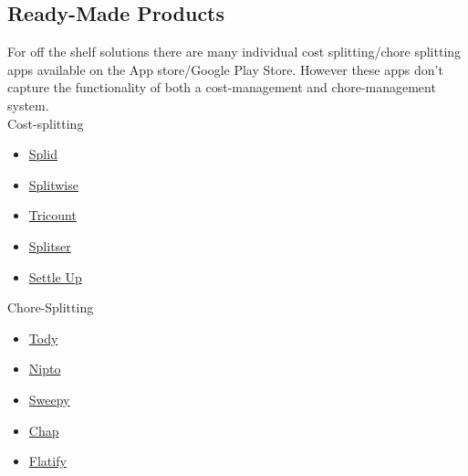 \documentclass[12pt]{article}
\newcommand{\lips}{\textit{Insert your content here.}}
\begin{document}
\subsection{Ready-Made Products}
For off the shelf solutions there are many individual cost splitting/chore splitting apps available on the App store/Google Play Store. However these apps don't capture the functionality of both a cost-management and chore-management system.\\

Cost-splitting
\begin{itemize}
    \item \href{https://play.google.com/store/apps/details?id=splid.teamturtle.com.splid&hl=en&gl=US}{Splid}
    \item \href{https://www.splitwise.com/}{Splitwise}
    \item \href{https://www.tricount.com/en/mobile}{Tricount}
    \item \href{https://splitser.com/}{Splitser}
    \item \href{https://settleup.io/}{Settle Up}
\end{itemize}



Chore-Splitting
\begin{itemize}
    \item \href{https://todyapp.com/}{Tody}
    \item \href{https://nipto.app/}{Nipto}
    \item \href{https://sweepy.app/}{Sweepy}
    \item \href{https://play.google.com/store/apps/details?id=com.remedy.chap&hl=en&gl=US}{Chap}
    \item \href{https://play.google.com/store/apps/details?id=flatify.com.flatify&pcampaignid=web_share}{Flatify}
\end{itemize}



\end{document}
